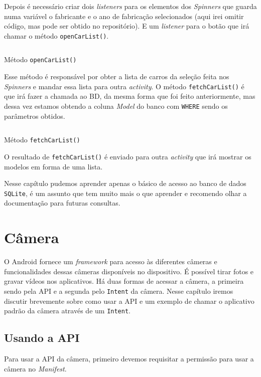 \documentclass[a4paper,12pt,brazil,oneside]{book}
\begin{document}
	Depois é necessário criar dois \emph{listeners} para os elementos dos \emph{Spinners} que guarda numa variável o fabricante e o ano de fabricação selecionados (aqui irei omitir código, mas pode ser obtido no repositório). E um \emph{listener} para o botão que irá chamar o método \texttt{openCarList()}.

	\begin{listing}[H]
		\inputminted[linenos=true,fontsize=\small,frame=lines, framesep=2mm, tabsize=2,numbersep=5pt]{java}{src/api/storage/db3.java}
		\caption{Método \texttt{openCarList()}}
		\label{code:db3}
	\end{listing} 	

	Esse método é responsável por obter a lista de carros da seleção feita nos \emph{Spinners} e mandar essa lista para outra \emph{activity}. O método \texttt{fetchCarList()} é que irá fazer a chamada ao BD, da mesma forma que foi feito anteriormente, mas dessa vez estamos obtendo a coluna \emph{Model} do banco com \texttt{WHERE} sendo os parâmetros obtidos. 

	\begin{listing}[H]
		\inputminted[linenos=true,fontsize=\small,frame=lines, framesep=2mm, tabsize=2,numbersep=5pt]{java}{src/api/storage/db4.java}
		\caption{Método \texttt{fetchCarList()}}
		\label{code:db4}
	\end{listing} 	

	O resultado de \texttt{fetchCarList()} é enviado para outra \emph{activity} que irá mostrar os modelos em forma de uma lista. 

	Nesse capítulo pudemos aprender apenas o básico de acesso ao banco de dados \texttt{SQLite}, é um assunto que tem muito mais o que aprender e recomendo olhar a documentação para futuras consultas. 
	
\chapter{Câmera}
	
	O Android fornece um \emph{framework} para acesso às diferentes câmeras e funcionalidades dessas câmeras disponíveis no dispositivo. É possível tirar fotos e gravar vídeos nos aplicativos. Há duas formas de acessar a câmera, a primeira sendo pela API e a segunda pelo \texttt{Intent} da câmera. 
	Nesse capítulo iremos discutir brevemente sobre como usar a API e um exemplo de chamar o aplicativo padrão da câmera através de um \texttt{Intent}.

	\section{Usando a API}
		Para usar a API da câmera, primeiro devemos requisitar a permissão para usar a câmera no \emph{Manifest}.
\end{document}
